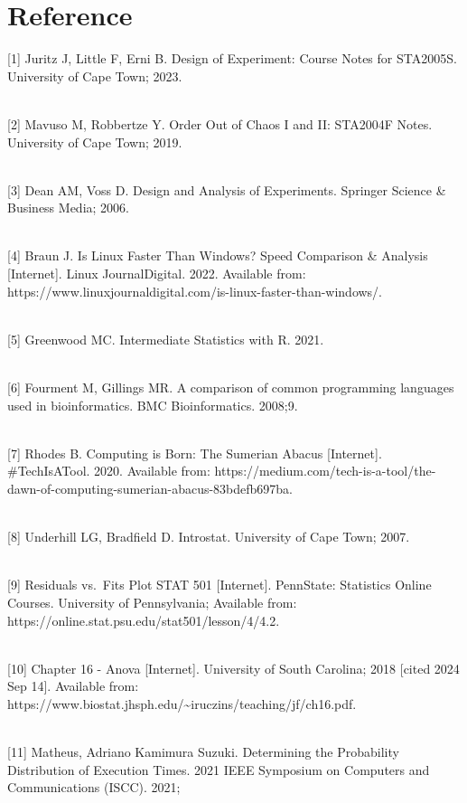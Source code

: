 \documentclass[12pt,halfline,a4paper,]{ouparticle}
\begin{document}
\newpage

\section{Reference}\label{reference}

{[}1{]} Juritz J, Little F, Erni B. Design of Experiment: Course Notes
for STA2005S. University of Cape Town; 2023.\\
\strut \\
{[}2{]} Mavuso M, Robbertze Y. Order Out of Chaos I and II: STA2004F
Notes. University of Cape Town; 2019.\\
\strut \\
{[}3{]} Dean AM, Voss D. Design and Analysis of Experiments. Springer
Science \& Business Media; 2006.\\
\strut \\
{[}4{]} Braun J. Is Linux Faster Than Windows? Speed Comparison \&
Analysis {[}Internet{]}. Linux JournalDigital. 2022. Available from:
https://www.linuxjournaldigital.com/is-linux-faster-than-windows/.\\
\strut \\
{[}5{]} Greenwood MC. Intermediate Statistics with R. 2021.\\
\strut \\
{[}6{]} Fourment M, Gillings MR. A comparison of common programming
languages used in bioinformatics. BMC Bioinformatics. 2008;9.\\
\strut \\
{[}7{]} Rhodes B. Computing is Born: The Sumerian Abacus {[}Internet{]}.
\#TechIsATool. 2020. Available from:
https://medium.com/tech-is-a-tool/the-dawn-of-computing-sumerian-abacus-83bdefb697ba.\\
\strut \\
{[}8{]} Underhill LG, Bradfield D. Introstat. University of Cape Town;
2007.\\
\strut \\
{[}9{]} Residuals vs.~Fits Plot \textbar{} STAT 501 {[}Internet{]}.
PennState: Statistics Online Courses. University of Pennsylvania;
Available from: https://online.stat.psu.edu/stat501/lesson/4/4.2.\\
\strut \\
{[}10{]} Chapter 16 - Anova {[}Internet{]}. University of South
Carolina; 2018 {[}cited 2024 Sep 14{]}. Available from:
https://www.biostat.jhsph.edu/\textasciitilde iruczins/teaching/jf/ch16.pdf.\\
\strut \\
{[}11{]} Matheus, Adriano Kamimura Suzuki. Determining the Probability
Distribution of Execution Times. 2021 IEEE Symposium on Computers and
Communications (ISCC). 2021;
\end{document}
